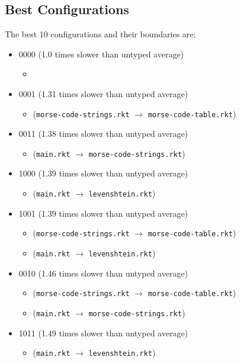 \documentclass{article}
\newcommand{\mono}[1]{\texttt{#1}}
\begin{document}
\subsection{Best Configurations}
The best 10 configurations and their boundaries are:
\begin{itemize}
\item 0000 (1.0 times slower than untyped average)
  \begin{itemize}
  \item 
  \end{itemize}
\item 0001 (1.31 times slower than untyped average)
  \begin{itemize}
  \item (\mono{morse-code-strings.rkt} $\rightarrow$ \mono{morse-code-table.rkt})
  \end{itemize}
\item 0011 (1.38 times slower than untyped average)
  \begin{itemize}
  \item (\mono{main.rkt} $\rightarrow$ \mono{morse-code-strings.rkt})
  \end{itemize}
\item 1000 (1.39 times slower than untyped average)
  \begin{itemize}
  \item (\mono{main.rkt} $\rightarrow$ \mono{levenshtein.rkt})
  \end{itemize}
\item 1001 (1.39 times slower than untyped average)
  \begin{itemize}
  \item (\mono{morse-code-strings.rkt} $\rightarrow$ \mono{morse-code-table.rkt})
  \item (\mono{main.rkt} $\rightarrow$ \mono{levenshtein.rkt})
  \end{itemize}
\item 0010 (1.46 times slower than untyped average)
  \begin{itemize}
  \item (\mono{morse-code-strings.rkt} $\rightarrow$ \mono{morse-code-table.rkt})
  \item (\mono{main.rkt} $\rightarrow$ \mono{morse-code-strings.rkt})
  \end{itemize}
\item 1011 (1.49 times slower than untyped average)
  \begin{itemize}
  \item (\mono{main.rkt} $\rightarrow$ \mono{levenshtein.rkt})

\end{itemize}
\end{itemize}
\end{document}
